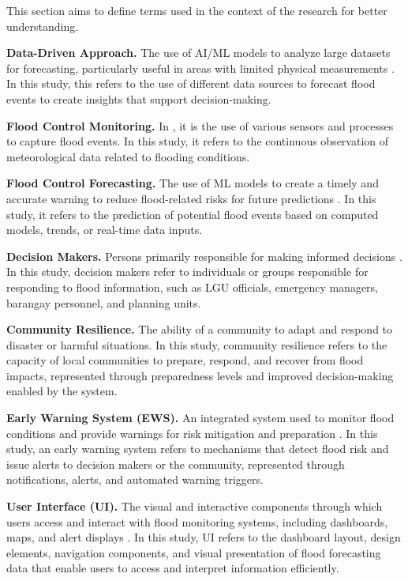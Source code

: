 \documentclass{research}
\begin{document}
This section aims to define terms used in the context of the research for better understanding.

\textbf{Data-Driven Approach.} The use of AI/ML models to analyze large datasets for forecasting, particularly useful in areas with limited physical measurements \cite{okuno2021practical}. In this study, this refers to the use of different data sources to forecast flood events to create insights that support decision-making.

\textbf{Flood Control Monitoring.} In \cite{tao2024review}, it is the use of various sensors and processes to capture flood events. In this study, it refers to the continuous observation of meteorological data related to flooding conditions.

\textbf{Flood Control Forecasting.} The use of ML models to create a timely and accurate warning to reduce flood-related risks for future predictions \cite{nevo2022flood}. In this study, it refers to the prediction of potential flood events based on computed models, trends, or real-time data inputs.

\textbf{Decision Makers.} Persons primarily responsible for making informed decisions \cite{najafi2024high}. In this study, decision makers refer to individuals or groups responsible for responding to flood information, such as LGU officials, emergency managers, barangay personnel, and planning units.

\textbf{Community Resilience.} The ability of a community to adapt and respond to disaster or harmful situations. In this study, community resilience refers to the capacity of local communities to prepare, respond, and recover from flood impacts, represented through preparedness levels and improved decision-making enabled by the system.

\textbf{Early Warning System (EWS).} An integrated system used to monitor flood conditions and provide warnings for risk mitigation and preparation \cite{hammood2021systematic}. In this study, an early warning system refers to mechanisms that detect flood risk and issue alerts to decision makers or the community, represented through notifications, alerts, and automated warning triggers.

\textbf{User Interface (UI).} The visual and interactive components through which users access and interact with flood monitoring systems, including dashboards, maps, and alert displays \cite{te2024smart}. In this study, UI refers to the dashboard layout, design elements, navigation components, and visual presentation of flood forecasting data that enable users to access and interpret information efficiently.
\end{document}
